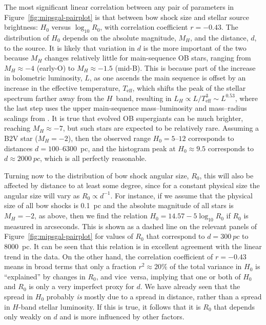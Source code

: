 The most significant linear correlation between any pair of parameters
in Figure~\ref{fig:mipsgal-pairplot} is that between bow shock size
and stellar source brightness: \(H_0\) versus \(\log_{10} R_0\), with
correlation coefficient \(r = -0.43\).  The distribution of \(H_0\)
depends on the absolute magnitude, \(M_H\), and the distance, \(d\),
to the source.  It is likely that variation in \(d\) is the more
important of the two because \(M_H\) changes relatively little for
main-sequence OB stars, ranging from \(M_H \approx -4\) (early-O) to
\(M_H \approx -1.5\) (mid-B).  This is because part of the increase in
bolometric luminosity, \(L\), as one ascends the main sequence is
offset by an increase in the effective temperature,
\(T_{\text{eff}}\), which shifts the peak of the stellar spectrum
farther away from the \(H\)~band, resulting in
\(L_H \propto L / T_{\text{eff}}^3 \sim L^{0.53}\), where the last step uses
the upper main-sequence mass--luminosity and mass--radius scalings from
\citet{Eker:2015a}. It is true that evolved OB supergiants can be much
brighter, reaching \(M_H \approx -7\), but such stars are expected to be
relatively rare.  Assuming a B2V star (\(M_H = -2\)), then the
observed range \(H_0 = 5\)--\(12\) corresponds to distances
\(d = 100\)--\SI{6300}{pc}, and the histogram peak at
\(H_0 \approx 9.5\) corresponds to \(d \approx \SI{2000}{pc}\), which is all
perfectly reasonable.

Turning now to the distribution of bow shock angular size, \(R_0\),
this will also be affected by distance to at least some degree, since
for a constant physical size the angular size will vary as
\(R_0 \propto d^{-1}\).  For instance, if we assume that the physical size
of all bow shocks is \SI{0.1}{pc} and the absolute magnitude of all
stars is \(M_H = -2\), as above, then we find the relation
\(H_0 = 14.57 - 5 \log_{10} R_0\) if \(R_0\) is measured in
arcseconds. This is shown as a dashed line on the relevant panels of
Figure~\ref{fig:mipsgal-pairplot} for values of \(R_0\) that
correspond to \(d = \SI{300}{pc}\) to \SI{8000}{pc}.  It can be seen
that this relation is in excellent agreement with the linear trend in
the data. On the other hand, the correlation coefficient of
\(r = -0.43\) means in broad terms that only a fraction
\(r^2 \approx 20\%\) of the total variance in \(H_0\) is ``explained'' by
changes in \(R_0\), and vice~versa, implying that one or both of
\(H_0\) and \(R_0\) is only a very imperfect proxy for \(d\).  We have
already seen that the spread in \(H_0\) probably \emph{is} mostly due
to a spread in distance, rather than a spread in \(H\)-band stellar
luminosity.  If this is true, it follows that it is \(R_0\) that
depends only weakly on \(d\) and is more influenced by other factors.

